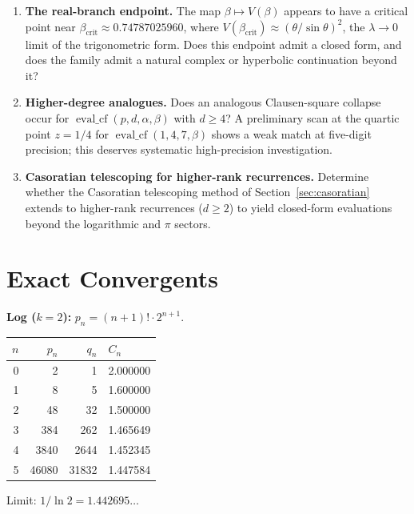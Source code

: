 \documentclass[11pt,a4paper]{article}
\theoremstyle{plain}
\theoremstyle{definition}
\theoremstyle{remark}
\begin{document}
\begin{enumerate}
\item \textbf{The real-branch endpoint.}
The map $\beta \mapsto V(\beta)$ appears to have a critical point
near $\beta_{\mathrm{crit}} \approx 0.74787025960$, where
$V(\beta_{\mathrm{crit}}) \approx (\theta/\sin\theta)^2$,
the $\lambda \to 0$ limit of the trigonometric form.
Does this endpoint admit a closed form,
and does the family admit a natural complex or hyperbolic
continuation beyond it?

\item \textbf{Higher-degree analogues.}
Does an analogous Clausen-square collapse occur for
$\operatorname{eval\_cf}(p, d, \alpha, \beta)$ with $d \ge 4$?
A preliminary scan at the quartic point $z = 1/4$
for $\operatorname{eval\_cf}(1,4,7,\beta)$ shows a weak match
at five-digit precision; this deserves systematic
high-precision investigation.

\item \textbf{Casoratian telescoping for higher-rank recurrences.}
Determine whether the Casoratian telescoping method of
Section~\ref{sec:casoratian} extends to higher-rank recurrences
($d \geq 2$) to yield closed-form evaluations beyond the logarithmic
and $\pi$ sectors.

\end{enumerate}

\section{Exact Convergents}\label{app:conv}

\textbf{Log ($k{=}2$):} $p_n = (n{+}1)!\cdot 2^{n+1}$.

\smallskip
\begin{center}
\begin{tabular}{@{}rrrl@{}}
\toprule
$n$ & $p_n$ & $q_n$ & $C_n$ \\
\midrule
0 & 2 & 1 & 2.000000 \\
1 & 8 & 5 & 1.600000 \\
2 & 48 & 32 & 1.500000 \\
3 & 384 & 262 & 1.465649 \\
4 & 3840 & 2644 & 1.452345 \\
5 & 46080 & 31832 & 1.447584 \\
\bottomrule
\end{tabular}
\end{center}
\smallskip\noindent Limit: $1/\ln 2 = 1.442695\ldots$
\end{document}

